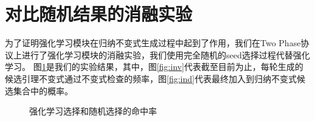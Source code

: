 \section{对比随机结果的消融实验}
为了证明强化学习模块在归纳不变式生成过程中起到了作用，我们在Two Phase协议上进行了强化学习模块的消融实验，我们使用完全随机的seed选择过程代替强化学习。
图\ref{fig:all}是我们的实验结果，其中，图\ref{fig:inv}代表截至目前为止，每轮生成的候选引理不变式通过不变式检查的频率，图\ref{fig:ind}代表最终加入到归纳不变式候选集合中的概率。
\begin{figure}[htb]
    \centering
    \hfill
    \hfill
    \caption{强化学习选择和随机选择的命中率}
    \label{fig:all}
\end{figure}
